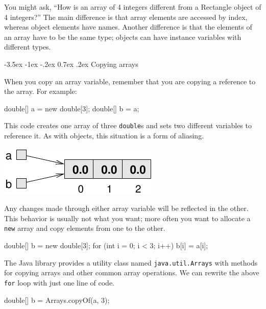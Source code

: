 \documentclass[12pt]{book}
\makeatletter
\theoremstyle{exercise}
\newcommand{\java}[1]{\verb"#1"}
\renewcommand{\section}{\@startsection {section}{1}{\z@}%
    {-3.5ex \@plus -1ex \@minus -.2ex}%
    {0.7ex \@plus.2ex}%
    {\normalfont\Large\bfseries}}
\newcommand{\java}[1]{\lstinline{#1}} %
\makeatother
\begin{document}
You might ask, ``How is an array of 4 integers different from a Rectangle object of 4 integers?''
The main difference is that array elements are accessed by index, whereas object elements have names.
Another difference is that the elements of an array have to be the same type; objects can have instance variables with different types.


\section{Copying arrays}

When you copy an array variable, remember that you are copying a reference to the array.
For example:

\begin{code}
    double[] a = new double[3];
    double[] b = a;
\end{code}

This code creates one array of three \java{double}s and sets two different variables to reference it.
As with objects, this situation is a form of aliasing.

\begin{center}
\includegraphics{figs/array3.pdf}
\end{center}

Any changes made through either array variable will be reflected in the other.
This behavior is usually not what you want; more often you want to allocate a \java{new} array and copy elements from one to the other.

\begin{code}
    double[] b = new double[3];
    for (int i = 0; i < 3; i++) {
        b[i] = a[i];
    }

\end{code}


The Java library provides a utility class named \java{java.util.Arrays} with methods for copying arrays and other common array operations.
We can rewrite the above \java{for} loop with just one line of code.

\begin{code}
    double[] b = Arrays.copyOf(a, 3);
\end{code}
\end{document}
